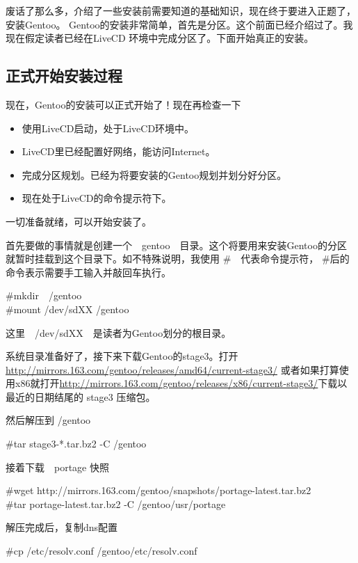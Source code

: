 废话了那么多，介绍了一些安装前需要知道的基础知识，现在终于要进入正题了，安装Gentoo。
Gentoo的安装非常简单，首先是分区。这个前面已经介绍过了。我现在假定读者已经在LiveCD 环境中完成分区了。下面开始真正的安装。


\subsection{正式开始安装过程}

现在，Gentoo的安装可以正式开始了！现在再检查一下

\begin{itemize}
\item	使用LiveCD启动，处于LiveCD环境中。
\item	LiveCD里已经配置好网络，能访问Internet。
\item	完成分区规划。已经为将要安装的Gentoo规划并划分好分区。
\item	现在处于LiveCD的命令提示符下。
\end{itemize}

一切准备就绪，可以开始安装了。

首先要做的事情就是创建一个　gentoo　目录。这个将要用来安装Gentoo的分区就暂时挂载到这个目录下。如不特殊说明，我使用 \#　代表命令提示符， \#后的命令表示需要手工输入并敲回车执行。

\begin{code}
\#mkdir　/gentoo\\
\#mount /dev/sdXX /gentoo
\end{code}

这里　/dev/sdXX　是读者为Gentoo划分的根目录。

系统目录准备好了，接下来下载Gentoo的stage3。打开　\url{http://mirrors.163.com/gentoo/releases/amd64/current-stage3/} 或者如果打算使用x86就打开\url{http://mirrors.163.com/gentoo/releases/x86/current-stage3/}下载以最近的日期结尾的 stage3 压缩包。

然后解压到 /gentoo
\begin{code}
\#tar stage3-*.tar.bz2 -C /gentoo 
\end{code}

接着下载　portage 快照
\begin{code}
\#wget http://mirrors.163.com/gentoo/snapshots/portage-latest.tar.bz2\\
\#tar portage-latest.tar.bz2 -C /gentoo/usr/portage
\end{code}

解压完成后，复制dns配置　
\begin{code}
\#cp /etc/resolv.conf /gentoo/etc/resolv.conf
\end{code}

